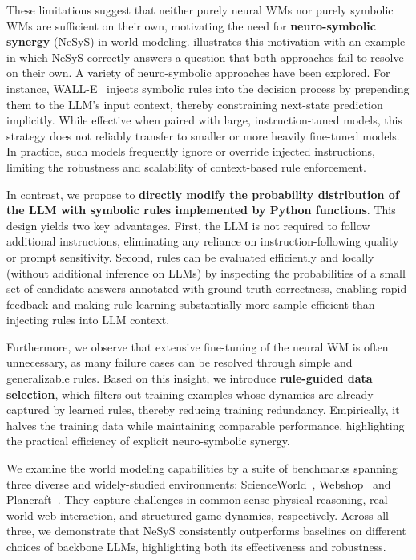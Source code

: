 \documentclass{article}
\theoremstyle{plain}
\theoremstyle{definition}
\theoremstyle{remark}
\newcommand{\ours}{{\sc NeSyS}\xspace}
\begin{document}
These limitations suggest that neither purely neural WMs nor purely symbolic WMs are sufficient on their own, motivating the need for \textbf{neuro-symbolic synergy} (\ours) in world modeling.  illustrates this motivation with an example in which \ours correctly answers a question that both approaches fail to resolve on their own. A variety of neuro-symbolic approaches have been explored. For instance, WALL-E~\citep{zhou2024wall,zhou2025wall} injects symbolic rules into the decision process by prepending them to the LLM’s input context, thereby constraining next-state prediction implicitly. While effective when paired with large, instruction-tuned models, this strategy does not reliably transfer to smaller or more heavily fine-tuned models. In practice, such models frequently ignore or override injected instructions, limiting the robustness and scalability of context-based rule enforcement.

In contrast, we propose to \textbf{directly modify the probability distribution of the LLM with symbolic rules implemented by Python functions}. This design yields two key advantages. First, the LLM is not required to follow additional instructions, eliminating any reliance on instruction-following quality or prompt sensitivity. Second, rules can be evaluated efficiently and locally (without additional inference on LLMs) by inspecting the probabilities of a small set of candidate answers annotated with ground-truth correctness, enabling rapid feedback and making rule learning substantially more sample-efficient than injecting rules into LLM context.

Furthermore, we observe that extensive fine-tuning of the neural WM is often unnecessary, as many failure cases can be resolved through simple and generalizable rules. Based on this insight, we introduce \textbf{rule-guided data selection}, which filters out training examples whose dynamics are already captured by learned rules, thereby reducing training redundancy. Empirically, it halves the training data while maintaining comparable performance, highlighting the practical efficiency of explicit neuro-symbolic synergy.

We examine the world modeling capabilities by a suite of benchmarks spanning three diverse and widely-studied environments: ScienceWorld~\citep{scienceworld2022}, Webshop~\citep{yao2022webshop} and Plancraft~\citep{dagan2024Plancraft}. They capture challenges in common-sense physical reasoning, real-world web interaction, and structured game dynamics, respectively. Across all three, we demonstrate that \ours consistently outperforms baselines on different choices of backbone LLMs, highlighting both its effectiveness and robustness. 
\end{document}
